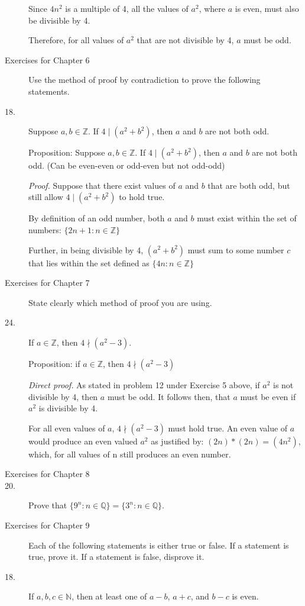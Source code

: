 \documentclass{article}
\begin{document}
\begin{description}
  Since $4n^2$ is a multiple of 4, all the values of $a^2$, where $a$ is even, must also be divisible by 4.
  
  Therefore, for all values of $a^2$ that are not divisible by 4, $a$ must be odd.

\item[Exercises for Chapter 6]
Use the method of proof by contradiction to prove the following statements.
\item[18.] Suppose $a,b\in\mathbb{Z}$.  If $4\mid (a^2 + b^2)$, then
  $a$ and $b$ are not both odd.
  
  Proposition: Suppose $a,b\in\mathbb{Z}$.  If $4\mid (a^2 + b^2)$, then
  $a$ and $b$ are not both odd. (Can be even-even or odd-even but not odd-odd)
  
  \textit{Proof.} Suppose that there exist values of $a$ and $b$ that are both odd, but still allow $4\mid(a^2+b^2)$ to hold true.
  
  By definition of an odd number, both $a$ and $b$ must exist within the set of numbers: $\{2n+1:n\in\mathbb{Z}\}$
  
  Further, in being divisible by 4, $(a^2+b^2)$ must sum to some number $c$ that lies within the set defined as $\{4n:n\in\mathbb{Z}\}$
  
\item[Exercises for Chapter 7]
  State clearly which method of proof you are using.
\item[24.]  If $a\in\mathbb{Z}$, then $4\nmid (a^2-3)$.

Proposition: if $a\in\mathbb{Z}$, then $4\nmid (a^2-3)$

\textit{Direct proof.} As stated in problem 12 under Exercise 5 above, if $a^2$ is not divisible by 4,
then $a$ must be odd. It follows then, that $a$ must be even if $a^2$ is divisible by 4.

For all even values of $a$, $4\nmid(a^2-3)$ must hold true. An even value of $a$ would produce an even valued $a^2$
as justified by: $(2n)*(2n) = (4n^2)$, which, for all values of n still produces an even number. 


  

\item[Exercises for Chapter 8]
\item[20.] Prove that $\{9^n:n\in\mathbb{Q}\}= \{3^n:n\in\mathbb{Q}\}$.  

\item[Exercises for Chapter 9]
  Each of the following statements is either true or false.
  If a statement is true, prove it.
  If a statement is false, disprove it.
\item[18.] If $a,b,c\in\mathbb{N}$, then at least one of $a-b$,
  $a+c$, and $b-c$ is even.


\end{description}
\end{document}
